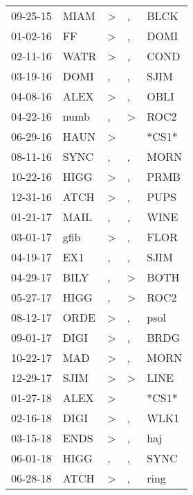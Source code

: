 \begin{supertabular}{lllll}
 09-25-15 &   MIAM &     \textgreater &                , &   BLCK \\
 01-02-16 &     FF &     \textgreater &                , &   DOMI \\
 02-11-16 &   WATR &     \textgreater &                , &   COND \\
 03-19-16 &   DOMI &                , &                , &   SJIM \\
 04-08-16 &   ALEX &     \textgreater &                , &   OBLI \\
 04-22-16 &   numb &                , &     \textgreater &   ROC2 \\
 06-29-16 &   HAUN &     \textgreater &                  &  *CS1* \\
 08-11-16 &   SYNC &                , &                , &   MORN \\
 10-22-16 &   HIGG &     \textgreater &                , &   PRMB \\
 12-31-16 &   ATCH &     \textgreater &                , &   PUPS \\
 01-21-17 &   MAIL &                , &                , &   WINE \\
 03-01-17 &   gfib &     \textgreater &                , &   FLOR \\
 04-19-17 &    EX1 &                , &                , &   SJIM \\
 04-29-17 &   BILY &                , &     \textgreater &   BOTH \\
 05-27-17 &   HIGG &                , &     \textgreater &   ROC2 \\
 08-12-17 &   ORDE &     \textgreater &                , &   psol \\
 09-01-17 &   DIGI &     \textgreater &                , &   BRDG \\
 10-22-17 &    MAD &     \textgreater &                , &   MORN \\
 12-29-17 &   SJIM &     \textgreater &     \textgreater &   LINE \\
 01-27-18 &   ALEX &     \textgreater &                  &  *CS1* \\
 02-16-18 &   DIGI &     \textgreater &                , &   WLK1 \\
 03-15-18 &   ENDS &     \textgreater &                , &    haj \\
 06-01-18 &   HIGG &                , &                , &   SYNC \\
 06-28-18 &   ATCH &     \textgreater &                , &   ring \\

\end{supertabular}
